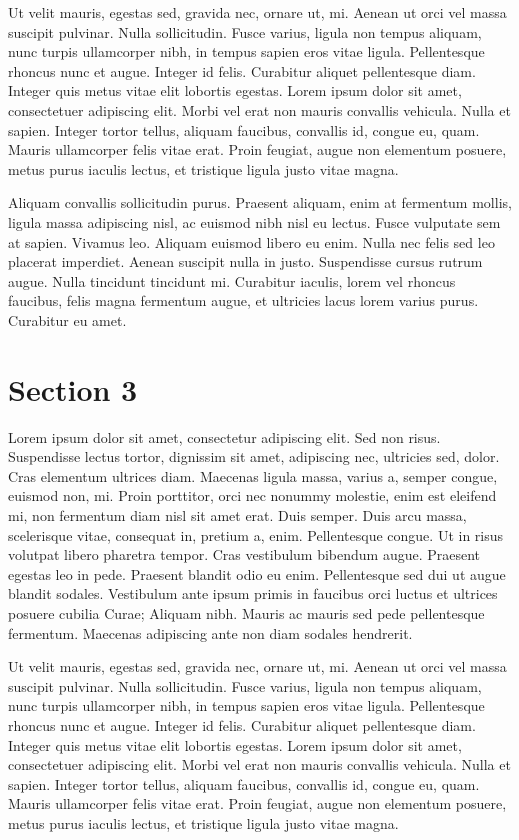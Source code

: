 \documentclass[11pt]{article}
\begin{document}
Ut velit mauris, egestas sed, gravida nec, ornare ut, mi. Aenean ut orci
vel massa suscipit pulvinar. Nulla sollicitudin. Fusce varius, ligula
non tempus aliquam, nunc turpis ullamcorper nibh, in tempus sapien eros
vitae ligula. Pellentesque rhoncus nunc et augue. Integer id felis.
Curabitur aliquet pellentesque diam. Integer quis metus vitae elit
lobortis egestas. Lorem ipsum dolor sit amet, consectetuer adipiscing
elit. Morbi vel erat non mauris convallis vehicula. Nulla et sapien.
Integer tortor tellus, aliquam faucibus, convallis id, congue eu, quam.
Mauris ullamcorper felis vitae erat. Proin feugiat, augue non elementum
posuere, metus purus iaculis lectus, et tristique ligula justo vitae
magna.

Aliquam convallis sollicitudin purus. Praesent aliquam, enim at
fermentum mollis, ligula massa adipiscing nisl, ac euismod nibh nisl eu
lectus. Fusce vulputate sem at sapien. Vivamus leo. Aliquam euismod
libero eu enim. Nulla nec felis sed leo placerat imperdiet. Aenean
suscipit nulla in justo. Suspendisse cursus rutrum augue. Nulla
tincidunt tincidunt mi. Curabitur iaculis, lorem vel rhoncus faucibus,
felis magna fermentum augue, et ultricies lacus lorem varius purus.
Curabitur eu amet.


\section{Section 3}
Lorem ipsum dolor sit amet, consectetur adipiscing elit. Sed non risus.
Suspendisse lectus tortor, dignissim sit amet, adipiscing nec, ultricies
sed, dolor. Cras elementum ultrices diam. Maecenas ligula massa, varius
a, semper congue, euismod non, mi. Proin porttitor, orci nec nonummy
molestie, enim est eleifend mi, non fermentum diam nisl sit amet erat.
Duis semper. Duis arcu massa, scelerisque vitae, consequat in, pretium
a, enim. Pellentesque congue. Ut in risus volutpat libero pharetra
tempor. Cras vestibulum bibendum augue. Praesent egestas leo in pede.
Praesent blandit odio eu enim. Pellentesque sed dui ut augue blandit
sodales. Vestibulum ante ipsum primis in faucibus orci luctus et
ultrices posuere cubilia Curae; Aliquam nibh. Mauris ac mauris sed pede
pellentesque fermentum. Maecenas adipiscing ante non diam sodales
hendrerit.

Ut velit mauris, egestas sed, gravida nec, ornare ut, mi. Aenean ut orci
vel massa suscipit pulvinar. Nulla sollicitudin. Fusce varius, ligula
non tempus aliquam, nunc turpis ullamcorper nibh, in tempus sapien eros
vitae ligula. Pellentesque rhoncus nunc et augue. Integer id felis.
Curabitur aliquet pellentesque diam. Integer quis metus vitae elit
lobortis egestas. Lorem ipsum dolor sit amet, consectetuer adipiscing
elit. Morbi vel erat non mauris convallis vehicula. Nulla et sapien.
Integer tortor tellus, aliquam faucibus, convallis id, congue eu, quam.
Mauris ullamcorper felis vitae erat. Proin feugiat, augue non elementum
posuere, metus purus iaculis lectus, et tristique ligula justo vitae
magna.
\end{document}
